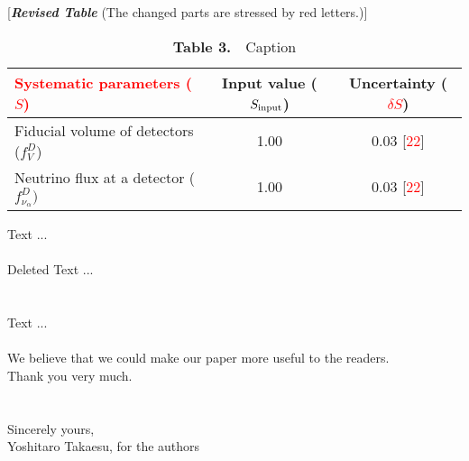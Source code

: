 \documentclass[a4paper,11pt]{article}
\begin{document}
\begin{table}[t]
\begin{center}
\caption*{[{\it\bf Revised Table} (The changed parts are stressed by red letters.)]}
\begin{tabular}{lcc}
\hline\hline\addlinespace[2 pt]
\textcolor{red}{Systematic parameters ($S$)}  & Input value (\textcolor{red}{$S_{\rm input}$}) & Uncertainty
	 (\textcolor{red}{$\delta S$})\\[2 pt]
\hline\addlinespace[2 pt]
Fiducial volume of detectors ($f_V^D$) & 1.00 & 0.03 [\textcolor{red}{22}]\\
Neutrino flux at a detector ($f_{\nu_{\alpha}}^D)$ & 1.00 & 0.03 [\textcolor{red}{22}]\\
\hline\hline
\end{tabular}
\end{center}
\caption*{{\bf Table 3.} \,\, Caption}
\label{tb:parameters}
\end{table}
\clearpage

\noindent Text ...
\\

\\
Deleted Text ...
\\
\\\\

\noindent Text ...
\\\\


\noindent We believe that we could make our paper more useful
to the readers.\\
\noindent Thank you very much.\\\\\\
\noindent Sincerely yours,\\

\noindent Yoshitaro Takaesu, for the authors
\end{document}
